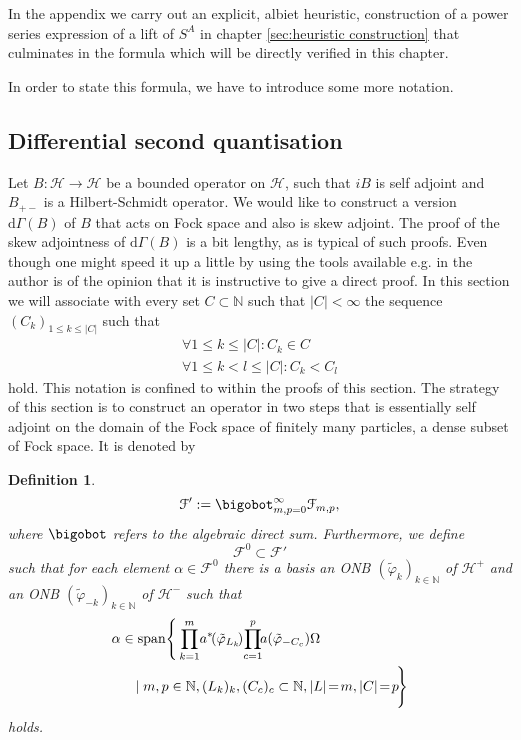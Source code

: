 \documentclass[b5paper,draft,openbib,12pt]{memoir}
\newtheorem{Def}{Definition}
\begin{document}
In the appendix we carry out an explicit, albiet heuristic, 
construction of a power series expression of a lift of \(S^A\)
 in chapter 
\ref{sec:heuristic construction} that culminates in 
the formula which will be directly verified in 
this chapter.

In order to state this formula, we have to introduce 
some more notation.

\subsection{Differential second quantisation}

Let \(B:\mathcal{H}\rightarrow\mathcal{H}\) be a bounded
operator on \(\mathcal{H}\), such that \(i B\) is self 
adjoint and \(B_{+-}\) is a Hilbert-Schmidt operator. 
We would like to construct a version \(\mathrm{d}\Gamma(B)\) 
of \(B\) that acts on Fock space and also is skew adjoint.
The proof of the skew adjointness of 
\(\mathrm{d}\Gamma(B)\) is a bit lengthy, as is typical 
of such proofs. Even though one might speed it 
up a little by using the tools available e.g. in 
\cite{derezinski2013mathematics} the author is of the 
opinion that it is instructive to give a direct proof.
In this section we will associate with every set 
\(C\subset\mathbb{N}\) such that \(|C|<\infty\) the 
sequence \((C_k)_{1\le k\le |C|}\) such that
\begin{align}
  \forall 1\le k \le |C|: C_k\in C\\
  \forall 1\le k<l\le |C|: C_k<C_l
\end{align}
hold. This notation is confined to within the 
proofs of this section.
The strategy of this section is to construct an operator in 
two steps that is essentially self adjoint on the domain 
of the Fock space of 
finitely many particles, a dense subset of Fock space. It is 
denoted by

\begin{Def}
\begin{equation}
\mathcal{F}':=\bigobot_{m,p=0}^\infty \mathcal{F}_{m,p},
\end{equation}
where \(\bigobot\) refers to the algebraic direct sum.
Furthermore, we define
\begin{equation}
\mathcal{F}^0\subset \mathcal{F}'
\end{equation}
such that for each element \(\alpha\in\mathcal{F}^0\) there is 
a basis an ONB \((\tilde{\varphi}_{k})_{k\in\mathbb{N}}\)
of \(\mathcal{H}^+\) and an ONB 
\((\tilde{\varphi}_{-k})_{k\in\mathbb{N}}\)
of \(\mathcal{H}^-\) such that 
\begin{align}
  &\alpha\in \mathrm{span}\Bigg\{\prod_{k=1}^m \!a^*\!(\tilde{\varphi}_{L_k}\!)\!\prod_{c=1}^p\!\! a(\tilde{\varphi}_{-C_c})\Omega \\
  &\hspace{0.5cm}\mid m,p \in \mathbb{N}, (L_k)_k, (C_c)_c \subset \mathbb{N}, |L|\!=\!m,|C|\!=\!p\! \Bigg\}
\end{align}
holds.
\end{Def}
\end{document}
